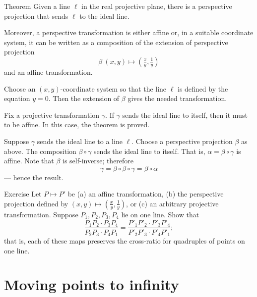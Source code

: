 \begin{thm}{Theorem}\label{thm:moving}
Given a line $\ell$ in the real projective plane, there is a perspective projection that sends $\ell$ to the ideal line.

Moreover, a perspective transformation is either affine or, in a suitable coordinate system, it can be written as a composition of the extension of perspective projection 
\[\beta\:(x,y)\mapsto (\tfrac xy,\tfrac 1y)\]
and an affine transformation.
\end{thm}

Choose an $(x,y)$-coordinate system so that the line $\ell$ is defined by the equation $y=0$. 
Then the extension of $\beta$ gives the needed transformation.

Fix a projective transformation $\gamma$.
If $\gamma$ sends the ideal line to itself,
then it must to be affine. 
In this case, the theorem is proved.

Suppose $\gamma$ sends the ideal line to a line $\ell$.
Choose a perspective projection $\beta$ as above.
The composition $\beta\circ\gamma$ sends the ideal line to itself.
That is, $\alpha=\beta\circ\gamma$ is affine.
Note that $\beta$ is self-inverse; therefore 
\[\gamma=\beta\circ\beta\circ\gamma=\beta\circ\alpha\]
--- hence the result.
\qeds

\begin{thm}{Exercise}\label{ex:proj-cross-ratio}
Let $P\mapsto P'$ be (a) an affine transformation, (b) the perspective projection defined by $(x,y)\mapsto (\tfrac xy,\tfrac 1y)$, or (c) an arbitrary projective transformation.
Suppose $P_1,P_2,P_3,P_4$ lie on one line.
Show that 
\[\frac{P_1P_2\cdot P_3P_4}{P_2P_3\cdot P_4P_1}=\frac{P'_1P'_2\cdot P'_3P'_4}{P'_2P'_3\cdot P'_4P'_1};\]
that is, each of these maps preserves the cross-ratio for quadruples of points on one line.

\end{thm}



\section{Moving points to infinity}

